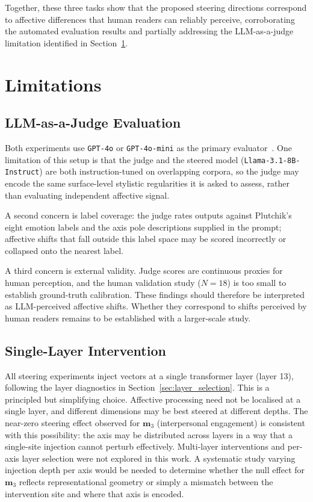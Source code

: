 Together, these three tasks show that the proposed steering directions correspond to affective differences that human readers can reliably perceive, corroborating the automated evaluation results and partially addressing the LLM-as-a-judge limitation identified in Section~\ref{sec:eval-limitations}.

\section{Limitations}
\label{sec:eval-limitations}

\subsection{LLM-as-a-Judge Evaluation}

Both experiments use \texttt{GPT-4o} or \texttt{GPT-4o-mini} as the primary evaluator~\cite{gu2025surveyllmasajudge}. One limitation of this setup is that the judge and the steered model (\texttt{Llama-3.1-8B-Instruct}) are both instruction-tuned on overlapping corpora, so the judge may encode the same surface-level stylistic regularities it is asked to assess, rather than evaluating independent affective signal. \par

A second concern is label coverage: the judge rates outputs against Plutchik's eight emotion labels and the axis pole descriptions supplied in the prompt; affective shifts that fall outside this label space may be scored incorrectly or collapsed onto the nearest label. \par

A third concern is external validity. Judge scores are continuous proxies for human perception, and the human validation study ($N = 18$) is too small to establish ground-truth calibration. These findings should therefore be interpreted as LLM-perceived affective shifts. Whether they correspond to shifts perceived by human readers remains to be established with a larger-scale study.\par

\subsection{Single-Layer Intervention}

All steering experiments inject vectors at a single transformer layer (layer 13), following the layer diagnostics in Section~\ref{sec:layer_selection}. This is a principled but simplifying choice. Affective processing need not be localised at a single layer, and different dimensions may be best steered at different depths. The near-zero steering effect observed for $\mathbf{m}_3$ (interpersonal engagement) is consistent with this possibility: the axis may be distributed across layers in a way that a single-site injection cannot perturb effectively. Multi-layer interventions and per-axis layer selection were not explored in this work. A systematic study varying injection depth per axis would be needed to determine whether the null effect for $\mathbf{m}_3$ reflects representational geometry or simply a mismatch between the intervention site and where that axis is encoded.\par

